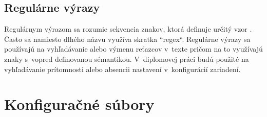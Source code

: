  \subsection{Regulárne výrazy}
 Regulárnym výrazom sa rozumie sekvencia znakov, ktorá definuje určitý vzor \cite{sBBUt3Q3bPUfAMue}. Často sa namiesto dlhého názvu využíva skratka ``regex``. Regulárne výrazy sa používajú na vyhľadávanie alebo výmenu reťazcov v~texte pričom na to využívajú znaky s~vopred definovanou sémantikou. V~diplomovej práci budú použité na vyhľadávanie prítomnosti alebo absencii nastavení v~konfigurácií zariadení. 
 \newpage
\section{Konfiguračné súbory}

